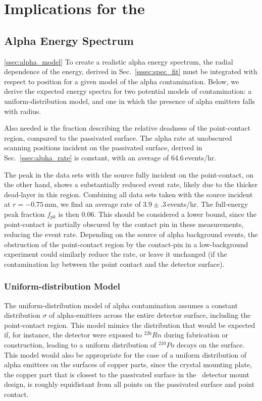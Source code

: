 \section{Implications for the \MJ\ \DEM\ }
\subsection{Alpha Energy Spectrum}\ref{ssec:alpha_model}
To create a realistic alpha energy spectrum, the radial dependence of the energy, derived in Sec.~\ref{sssec:spec_fit} must be integrated with respect to position for a given model of the alpha contamination. Below, we derive the expected energy spectra for two potential models of contamination: a uniform-distribution model, and one in which the presence of alpha emitters falls with radius.  

Also needed is the fraction describing the relative deadness of the point-contact region, compared to the passivated surface. The alpha rate at unobscured scanning positions incident on the passivated surface, derived in Sec.~\ref{ssec:alpha_rate} is constant, with an average of 64.6\,events/hr. 

The peak in the data sets with the source fully incident on the point-contact, on the other hand, shows a substantially reduced event rate, likely due to the thicker dead-layer in this region. Combining all data sets taken with the source incident at $r=-0.75$\,mm, we find an average rate of $3.9\pm.3$\,events/hr. The full-energy peak fraction $f_{pk}$ is then 0.06. This should be considered a lower bound, since the point-contact is partially obscured by the contact pin in these measurements, reducing the event rate. Depending on the source of alpha background events, the obstruction of the point-contact region by the contact-pin in a low-background experiment could similarly reduce the rate, or leave it unchanged (if the contamination lay between the point contact and the detector surface). 

\subsubsection{Uniform-distribution Model}
The uniform-distribution model of alpha contamination assumes a constant distribution $\sigma$ of alpha-emitters across the entire detector surface, including the point-contact region. This model mimics the distribution that would be expected if, for instance, the detector were exposed to $^{226}Rn$ during fabrication or construction, leading to a uniform distribution of $^{210}Po$ decays on the surface. This model would also be appropriate for the case of a uniform distribution of alpha emitters on the surfaces of copper parts, since the crystal mounting plate, the copper part that is closest to the passivated surface in the \MJ\ detector mount design, is roughly equidistant from all points on the passivated surface and point contact. 


